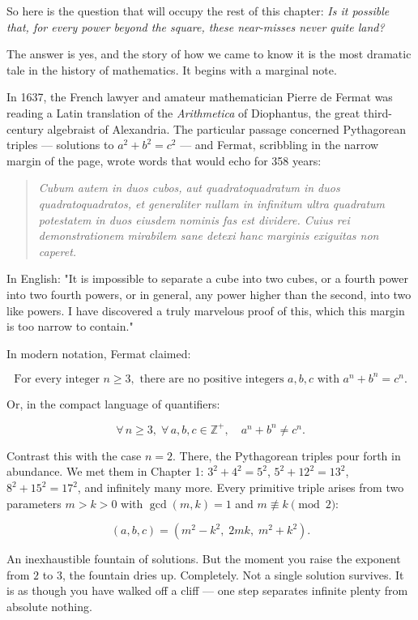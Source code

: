 \documentclass[11pt,twoside,openright]{book}
\theoremstyle{definition}
\theoremstyle{remark}
\begin{document}
So here is the question that will occupy the rest of this chapter: \textit{Is it possible that, for every power beyond the square, these near-misses never quite land?}

The answer is yes, and the story of how we came to know it is the most dramatic tale in the history of mathematics. It begins with a marginal note.

In 1637, the French lawyer and amateur mathematician Pierre de Fermat was reading a Latin translation of the \textit{Arithmetica} of Diophantus, the great third-century algebraist of Alexandria. The particular passage concerned Pythagorean triples --- solutions to $a^2 + b^2 = c^2$ --- and Fermat, scribbling in the narrow margin of the page, wrote words that would echo for 358 years:

\begin{quote}
\textit{Cubum autem in duos cubos, aut quadratoquadratum in duos quadratoquadratos, et generaliter nullam in infinitum ultra quadratum potestatem in duos eiusdem nominis fas est dividere. Cuius rei demonstrationem mirabilem sane detexi hanc marginis exiguitas non caperet.}
\end{quote}
In English: "It is impossible to separate a cube into two cubes, or a fourth power into two fourth powers, or in general, any power higher than the second, into two like powers. I have discovered a truly marvelous proof of this, which this margin is too narrow to contain."


In modern notation, Fermat claimed:

\[\text{For every integer } n \ge 3, \text{ there are no positive integers } a, b, c \text{ with } a^n + b^n = c^n.\]

Or, in the compact language of quantifiers:

\[\forall\, n \ge 3,\; \forall\, a, b, c \in \mathbb{Z}^+, \quad a^n + b^n \neq c^n.\]

Contrast this with the case $n = 2$. There, the Pythagorean triples pour forth in abundance. We met them in Chapter 1: $3^2 + 4^2 = 5^2$, $5^2 + 12^2 = 13^2$, $8^2 + 15^2 = 17^2$, and infinitely many more. Every primitive triple arises from two parameters $m > k > 0$ with $\gcd(m, k) = 1$ and $m \not\equiv k \pmod{2}$:

\[(a, b, c) = (m^2 - k^2,\; 2mk,\; m^2 + k^2).\]

An inexhaustible fountain of solutions. But the moment you raise the exponent from $2$ to $3$, the fountain dries up. Completely. Not a single solution survives. It is as though you have walked off a cliff --- one step separates infinite plenty from absolute nothing.
\end{document}
